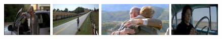 \documentclass[10pt,twocolumn,letterpaper]{article}
\begin{document}
\begin{figure}[!t]
\begin{center}
\vspace{-0cm}
\includegraphics[height=1.61cm]{figures/dataset_thumb/hwd/class1.jpg} 
\includegraphics[height=1.61cm]{figures/dataset_thumb/hwd/class2.jpg} 
\includegraphics[height=1.61cm]{figures/dataset_thumb/hwd/class3.jpg}  
\includegraphics[height=1.61cm]{figures/dataset_thumb/hwd/class4.jpg}

\end{center}
\end{figure}
\end{document}
